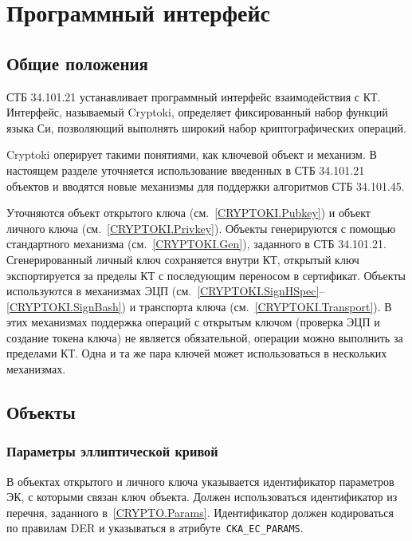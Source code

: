 \chapter{Программный интерфейс}\label{CRYPTOKI}

\section{Общие положения}\label{CRYPTOKI.Common}

СТБ 34.101.21 устанавливает программный интерфейс взаимодействия с КТ. 
Интерфейс, называемый Cryptoki, определяет фиксированный набор функций языка 
Си, позволяющий выполнять широкий набор криптографических операций. 

Cryptoki оперирует такими понятиями, как ключевой объект и механизм.
%
В настоящем разделе уточняется использование введенных
в СТБ 34.101.21 объектов и вводятся новые механизмы для поддержки
алгоритмов СТБ 34.101.45.

Уточняются объект открытого ключа (см.~\ref{CRYPTOKI.Pubkey}) и объект
личного ключа (см.~\ref{CRYPTOKI.Privkey}). Объекты генерируются с помощью 
стандартного механизма (см.~\ref{CRYPTOKI.Gen}), заданного в СТБ 34.101.21. 
%
Сгенерированный личный ключ сохраняется внутри КТ, открытый ключ 
экспортируется за пределы КТ с последующим переносом в сертификат. 
Объекты используются в механизмах ЭЦП 
(см.~\ref{CRYPTOKI.SignHSpec}--\ref{CRYPTOKI.SignBash}) и транспорта ключа 
(см.~\ref{CRYPTOKI.Transport}).
%
В этих механизмах поддержка операций с открытым ключом (проверка ЭЦП и 
создание токена ключа) не является обязательной, операции можно выполнить 
за пределами КТ. Одна и та же пара ключей может использоваться в 
нескольких механизмах.

\section{Объекты}\label{CRYPTOKI.Obj}

\subsection{Параметры эллиптической кривой}\label{CRYPTOKI.Params}

В объектах открытого и личного ключа указывается 
идентификатор параметров ЭК, с которыми связан ключ объекта.
%
Должен использоваться идентификатор из перечня, заданного 
в~\ref{CRYPTO.Params}.
%
Идентификатор должен кодироваться по правилам DER и указываться в 
атрибуте~\verb|CKA_EC_PARAMS|.

